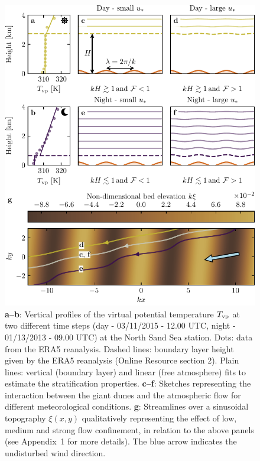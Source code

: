 \begin{figure}
\centering
\includegraphics[scale=1]{Figures/Figure7.pdf}
\caption{\textbf{a--b}: Vertical profiles of the virtual potential temperature $T_{\rm vp}$ at two different time steps (day - 03/11/2015 - 12.00 UTC, night - 01/13/2013 - 09.00 UTC) at the North Sand Sea station. Dots: data from the ERA5 reanalysis. Dashed lines: boundary layer height given by the ERA5 reanalysis (Online Resource section 2). Plain lines: vertical (boundary layer) and linear (free atmosphere) fits to estimate the stratification properties. \textbf{c--f}: Sketches representing the interaction between the giant dunes and the atmospheric flow for different meteorological conditions. \textbf{g}: Streamlines over a sinusoidal topography $\xi(x,y)$ qualitatively representing the effect of low, medium and strong flow confinement, in relation to the above panels (see Appendix~1 for more details). The blue arrow indicates the undisturbed wind direction.}
\label{Fig7}
\end{figure}


